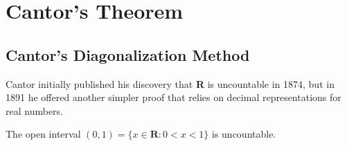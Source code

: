 \section{Cantor's Theorem}
    \subsection*{Cantor's Diagonalization Method}
        Cantor initially published his discovery that \textbf{R} is uncountable in 1874, but in 1891 he offered another simpler proof that relies on decimal representations for real numbers.
        \begin{theorem}
            The open interval $(0, 1) = \{x \in \textbf{R}: 0 < x < 1\}$ is uncountable.
        \end{theorem} 